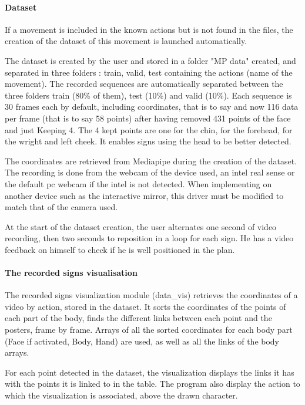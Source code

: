 \paragraph{Dataset}

If a movement is included in the known actions but is not found in the files, the creation of the dataset of this movement is launched automatically. 

The dataset is created by the user and stored in a folder "MP data" created, and separated in three
folders : train, valid, test containing the actions (name of the
movement). The recorded sequences are automatically separated
between the three folders train (80\% of them), test (10\%) and valid
(10\%). Each sequence is 30 frames each by default, including coordinates, that is to say and now 116 data per frame (that is to say 58 points) after having removed  431 points of the face and just Keeping 4. The 4 kept points are one for the chin, for the forehead, for the wright and left cheek.
It enables signs using the head to be better detected.

The coordinates are retrieved from Mediapipe during the creation of the dataset. The recording is done from the webcam of the device used, an intel real sense or the default pc webcam if the intel is not detected. When implementing on another device such as the interactive mirror, this driver must be modified to match that of the camera used.

At the start of the dataset creation, the user alternates one second of video recording, then two seconds to reposition in a loop for each sign. He has a video feedback on himself to check if he is well positioned in the plan.

\paragraph{The recorded signs visualisation}

The recorded signs visualization module (data\_vis) retrieves the coordinates of a video by action, stored in the dataset.
It sorts the coordinates of the points of each part of the body, finds the different links between each point and the posters, frame by frame. Arrays of all the sorted coordinates for each body part (Face if activated, Body, Hand) are used, as well as all the links of the body arrays.

For each point detected in the dataset, the visualization displays the links it has with the points it is linked to in the table. The program also display the action to which the visualization is associated, above the drawn character.

